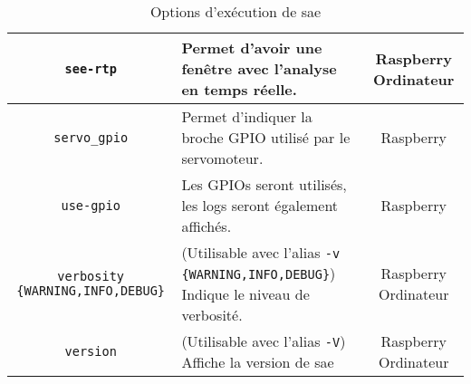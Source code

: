 \begin{table}[H]
\begin{tabularx}{\linewidth}{|c|X|c|}
        \verb=see-rtp=                               & Permet d'avoir une fenêtre avec l'analyse en temps réelle.                                                                                                        & Raspberry Ordinateur    \\\hline
        \verb=servo_gpio=                            & Permet d'indiquer la broche GPIO utilisé par le servomoteur.                                                                                                      & Raspberry               \\\hline        
        \verb=use-gpio=                              & Les GPIOs seront utilisés, les logs seront également affichés.                                                                                                    & Raspberry               \\\hline
        \verb=verbosity {WARNING,INFO,DEBUG}=        & (Utilisable avec l'alias \verb=-v {WARNING,INFO,DEBUG}=) Indique le niveau de verbosité.                                                                          & Raspberry Ordinateur    \\\hline
        \verb=version=                               & (Utilisable avec l'alias \verb=-V=) Affiche la version de \gls{sae}                                                                                               & Raspberry Ordinateur    \\\hline
    \end{tabularx}
    \label{tabOptClearway}
    \caption{Options d'exécution de \gls{sae}}
\end{table}

